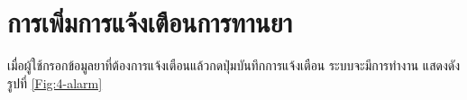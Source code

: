 







\section{การเพิ่มการแจ้งเตือนการทานยา}
เมื่อผู้ใช้กรอกข้อมูลยาที่ต้องการแจ้งเตือนแล้วกดปุ่มบันทึกการแจ้งเตือน ระบบจะมีการทำงาน แสดงดังรูปที่ \ref{Fig:4-alarm}

